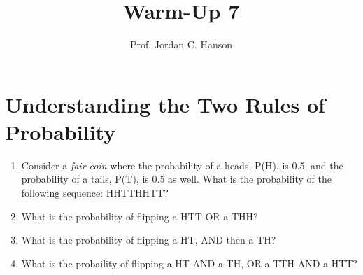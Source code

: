 \documentclass{article}
\begin{document}
\title{Warm-Up 7}
\author{Prof. Jordan C. Hanson}

\maketitle

\section{Understanding the Two Rules of Probability}

\begin{enumerate}
\item Consider a \textit{fair coin} where the probability of a heads, P(H), is 0.5, and the probability of a tails, P(T), is 0.5 as well.  What is the probability of the following sequence: HHTTHHTT? \\ \vspace{2cm}
\item What is the probability of flipping a HTT OR a THH? \\ \vspace{2cm}
\item What is the probability of flipping a HT, AND then a TH? \\ \vspace{2cm}
\item What is the probaility of flipping a HT AND a TH, OR a TTH AND a HTT?
\end{enumerate}
\end{document}
